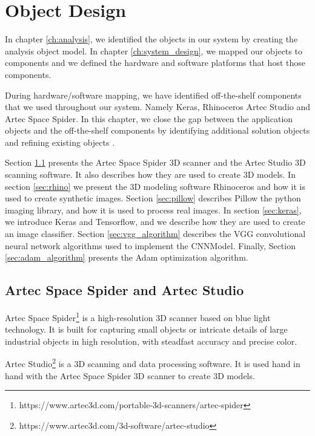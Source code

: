 \chapter{Object Design}\label{ch:object_design}
In chapter \ref{ch:analysis}, we identified the objects in our system by creating the analysis object model. In chapter \ref{ch:system_design}, we mapped our objects to components and we defined the hardware and software platforms that host those components.

During hardware/software mapping, we have identified off-the-shelf components that we used throughout our system. Namely Keras, Rhinoceros Artec Studio and Artec Space Spider. In this chapter, we close the gap between the application objects and the off-the-shelf components by identifying additional solution objects and refining existing objects \cite{bruegge2004object}.

Section \ref{sec:artec} presents the Artec Space Spider 3D scanner and the Artec Studio 3D scanning software. It also describes how they are used to create 3D models. In section \ref{sec:rhino} we present the 3D modeling software Rhinoceros and how it is used to create synthetic images. Section \ref{sec:pillow} describes Pillow the python imaging library, and how it is used to process real images. In section \ref{sec:keras}, we introduce Keras and Tensorflow, and we describe how they are used to create an image classifier. Section \ref{sec:vgg_algorithm} describes the VGG convolutional neural network algorithms used to implement the CNNModel. Finally, Section \ref{sec:adam_algorithm} presents the Adam optimization algorithm.


\section{Artec Space Spider and Artec Studio}\label{sec:artec}
Artec Space Spider\footnote{https://www.artec3d.com/portable-3d-scanners/artec-spider} is a high-resolution 3D scanner based on blue light technology. It is built for capturing small objects or intricate details of large industrial objects in high resolution, with steadfast accuracy and precise color.

Artec Studio\footnote{https://www.artec3d.com/3d-software/artec-studio} is a 3D scanning and data processing software. It is used hand in hand with the Artec Space Spider 3D scanner to create 3D models.

